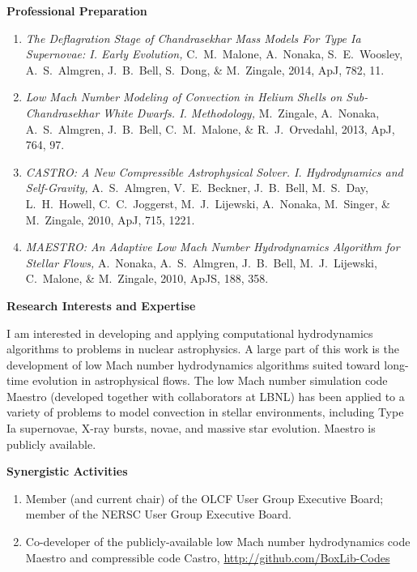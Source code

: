 \documentclass[11pt,letterpaper,english]{article}
\begin{document}
\begin{flushleft} {\bf Professional Preparation}
\begin{enumerate}
\item {\it The Deflagration Stage of Chandrasekhar Mass Models For
  Type Ia Supernovae: I. Early Evolution, } C.~M.~Malone, A.~Nonaka,
  S.~E.~Woosley, A.~S.~Almgren, J.~B.~Bell, S.~Dong, \& M.~Zingale,
  2014, ApJ, 782, 11.

\item {\it Low Mach Number Modeling of Convection in Helium Shells on
  Sub-Chandrasekhar White Dwarfs. I. Methodology,} M.~Zingale,
  A.~Nonaka, A.~S.~Almgren, J.~B.~Bell, C.~M.~Malone, \&
  R.~J.~Orvedahl, 2013, ApJ, 764, 97.

\item {\it CASTRO: A New Compressible Astrophysical
  Solver. I. Hydrodynamics and Self-Gravity,} A.~S.~Almgren,
  V.~E.~Beckner, J.~B.~Bell, M.~S.~Day, L.~H.~Howell, C.~C.~Joggerst,
  M.~J.~Lijewski, A.~Nonaka, M.~Singer, \& M.~Zingale, 2010, ApJ, 715,
  1221.

\item {\it MAESTRO: An Adaptive Low Mach Number Hydrodynamics
  Algorithm for Stellar Flows,} A.~Nonaka, A.~S.~Almgren, J.~B.~Bell,
  M.~J.~Lijewski, C.~Malone, \& M.~Zingale, 2010, ApJS, 188, 358.

\end{enumerate} 

\vspace{-6pt}
{\bf Research Interests and Expertise}
{\parindent 16pt

I am interested in developing and
  applying computational hydrodynamics algorithms to problems in
  nuclear astrophysics.  A large part of this work is the development
  of low Mach number hydrodynamics algorithms suited toward long-time
  evolution in astrophysical flows.  The low Mach number simulation
  code Maestro (developed together with collaborators at LBNL) has
  been applied to a variety of problems to model convection in stellar
  environments, including Type Ia supernovae, X-ray bursts, novae,
  and massive star evolution.  Maestro is publicly available.

}

\vspace{.04in}
{\bf Synergistic Activities}
\vspace{-6pt}
\begin{enumerate} \itemsep1pt \parskip0pt 
\item Member (and current chair) of the OLCF User Group Executive Board;
  member of the NERSC User Group Executive Board.

\item Co-developer of the publicly-available low Mach number
  hydrodynamics code Maestro and compressible code Castro,
  \url{http://github.com/BoxLib-Codes} \\


\end{enumerate}
\end{flushleft}
\end{document}
